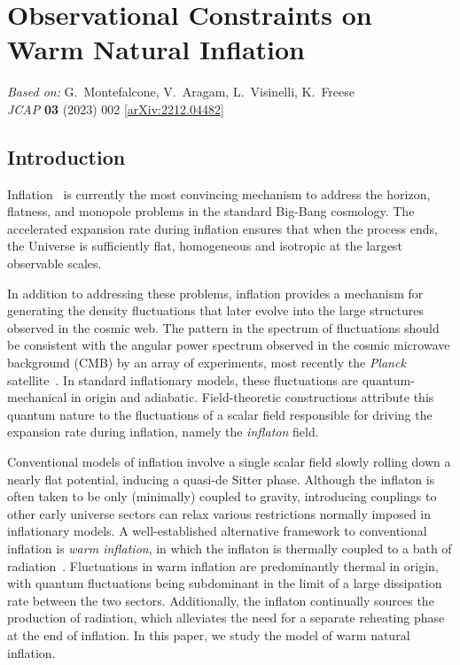 \chapter{Observational Constraints on Warm Natural Inflation}
\label{ch:wi-natural}

\begin{center}
\textit{Based on:} G.~Montefalcone, V.~Aragam, L.~Visinelli, K.~Freese\\
\textit{JCAP} \textbf{03} (2023) 002
[\href{https://arxiv.org/abs/2212.04482}{arXiv:2212.04482}]
\end{center}
\vspace{1em}


\section{Introduction}
\label{sec:ch3-introduction}

Inflation~\cite{Guth:1980zm, Linde:1981mu, Albrecht:1982wi, Kazanas:1980tx, Starobinsky:1980te, Sato:1980yn, Mukhanov:1981xt, Linde:1983gd, Mukhanov:1990me} is currently the most convincing mechanism to address the horizon, flatness, and monopole problems in the standard Big-Bang cosmology. The accelerated expansion rate during inflation ensures that when the process ends, the Universe is sufficiently flat, homogeneous and isotropic at the largest observable scales.

In addition to addressing these problems, inflation provides a mechanism for generating the density fluctuations that later evolve into the large structures observed in the cosmic web. The pattern in the spectrum of fluctuations should be consistent with the angular power spectrum observed in the cosmic microwave background (CMB) by an array of experiments, most recently the {\it Planck} satellite~\cite{Planck:2018nkj}. In standard inflationary models, these fluctuations are quantum-mechanical in origin and adiabatic. Field-theoretic constructions attribute this quantum nature to the fluctuations of a scalar field responsible for driving the expansion rate during inflation, namely the {\it inflaton} field.

Conventional models of inflation involve a single scalar field slowly rolling down a nearly flat potential, inducing a quasi-de Sitter phase. Although the inflaton is often taken to be only (minimally) coupled to gravity, introducing couplings to other early universe sectors can relax various restrictions normally imposed in inflationary models. A well-established alternative framework to conventional inflation is \textit{warm inflation}, in which the inflaton is thermally coupled to a bath of radiation~\cite{Berera:1995ie, Berera:1996fm}. Fluctuations in warm inflation are predominantly thermal in origin, with quantum fluctuations being subdominant in the limit of a large dissipation rate between the two sectors. Additionally, the inflaton continually sources the production of radiation, which alleviates the need for a separate reheating phase at the end of inflation. In this paper, we study the model of warm natural inflation.

